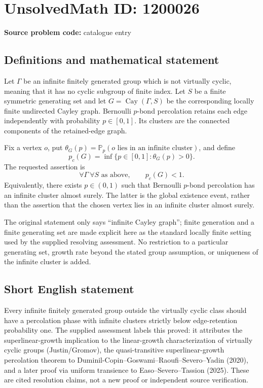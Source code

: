 \documentclass[11pt]{article}
\begin{document}
\section*{UnsolvedMath ID: 1200026}
\textbf{Source problem code:} catalogue entry
\subsection{Definitions and mathematical statement}
Let $\Gamma$ be an infinite finitely generated group which is not virtually cyclic, meaning that it has no cyclic subgroup of finite index. Let $S$ be a finite symmetric generating set and let $G=\operatorname{Cay}(\Gamma,S)$ be the corresponding locally finite undirected Cayley graph. Bernoulli $p$-bond percolation retains each edge independently with probability $p\in[0,1]$. Its clusters are the connected components of the retained-edge graph.

Fix a vertex $o$, put $\theta_G(p)=\mathbb P_p(o\text{ lies in an infinite cluster})$, and define
\[
 p_c(G)=\inf\{p\in[0,1]:\theta_G(p)>0\}.
\]
The requested assertion is
\[
 \forall\Gamma\ \forall S\text{ as above},\qquad p_c(G)<1.
\]
Equivalently, there exists $p\in(0,1)$ such that Bernoulli $p$-bond percolation has an infinite cluster almost surely. The latter is the global existence event, rather than the assertion that the chosen vertex lies in an infinite cluster almost surely.

The original statement only says ``infinite Cayley graph''; finite generation and a finite generating set are made explicit here as the standard locally finite setting used by the supplied resolving assessment. No restriction to a particular generating set, growth rate beyond the stated group assumption, or uniqueness of the infinite cluster is added.
\subsection{Short English statement}
Every infinite finitely generated group outside the virtually cyclic class should have a percolation phase with infinite clusters strictly below edge-retention probability one. The supplied assessment labels this proved: it attributes the superlinear-growth implication to the linear-growth characterization of virtually cyclic groups (Justin/Gromov), the quasi-transitive superlinear-growth percolation theorem to Duminil-Copin--Goswami--Raoufi--Severo--Yadin (2020), and a later proof via uniform transience to Easo--Severo--Tassion (2025). These are cited resolution claims, not a new proof or independent source verification.
\end{document}
